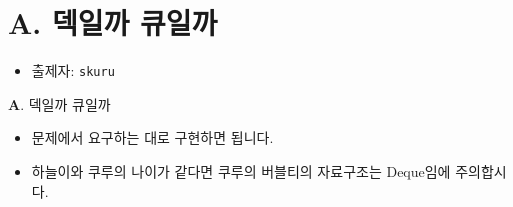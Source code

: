 \section{A. 덱일까 큐일까}

\begin{frame} %
    \begin{itemize}
        \item 출제자: \texttt{skuru}
    \end{itemize}
\end{frame}

\begin{frame}{\textbf{A}. 덱일까 큐일까}
    \begin{itemize}
        \item 문제에서 요구하는 대로 구현하면 됩니다.
        \item 하늘이와 쿠루의 나이가 같다면 쿠루의 버블티의 자료구조는 Deque임에 주의합시다.
    \end{itemize}
\end{frame}
